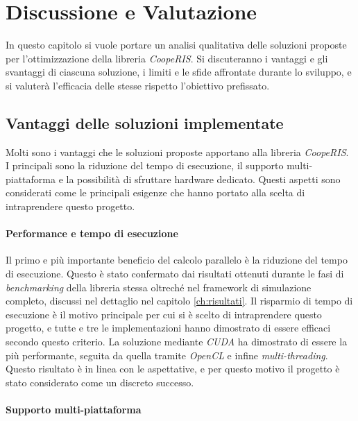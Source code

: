 \section{Discussione e Valutazione}
\label{ch:discussione}

In questo capitolo si vuole portare un analisi qualitativa delle soluzioni
proposte per l'ottimizzazione della libreria \textit{CoopeRIS}. Si discuteranno
i vantaggi e gli svantaggi di ciascuna soluzione, i limiti e le sfide affrontate
durante lo sviluppo, e si valuterà l'efficacia delle stesse rispetto l'obiettivo
prefissato.

\subsection{Vantaggi delle soluzioni implementate}
\label{subsec:vantaggi}

Molti sono i vantaggi che le soluzioni proposte apportano alla libreria \textit{CoopeRIS}.
I principali sono la riduzione del tempo di esecuzione, il supporto multi-piattaforma
e la possibilità di sfruttare hardware dedicato. Questi aspetti sono considerati
come le principali esigenze che hanno portato alla scelta di intraprendere questo
progetto.

\paragraph{Performance e tempo di esecuzione}
\label{para:performance}

Il primo e più importante beneficio del calcolo parallelo è la riduzione del tempo
di esecuzione. Questo è stato confermato dai risultati ottenuti durante le fasi
di \textit{benchmarking} della libreria stessa oltreché nel framework di simulazione
completo, discussi nel dettaglio nel capitolo \ref{ch:risultati}. Il risparmio di
tempo di esecuzione è il motivo principale per cui si è scelto di intraprendere questo
progetto, e tutte e tre le implementazioni hanno dimostrato di essere efficaci
secondo questo criterio. La soluzione mediante \textit{CUDA} ha dimostrato di
essere la più performante, seguita da quella tramite \textit{OpenCL} e infine
\textit{multi-threading}. Questo risultato è in linea con le aspettative, e per questo
motivo il progetto è stato considerato come un discreto successo.

\paragraph{Supporto multi-piattaforma}
\label{para:supporto}

